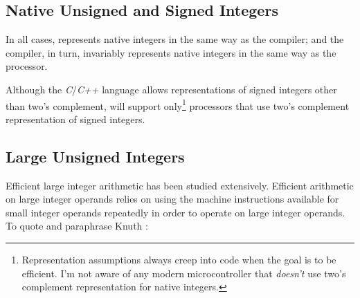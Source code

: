 \subsection{Native Unsigned and Signed Integers}
\label{cldd0:srnm0:srin0}

In all cases, \emph{\productbasenameshort{}} represents 
native integers in the same way as the compiler; and the 
compiler, in turn, invariably represents native integers in 
the same way as the processor.  

Although the \emph{C}/\emph{C++} language allows 
representations of signed integers other than two's 
complement, \emph{\productbasenameshort{}} will support 
only\footnote{Representation assumptions always creep into 
code when the goal is to be efficient.  I'm not aware of any 
modern microcontroller that \emph{doesn't} use two's 
complement representation for native integers.} processors 
that use two's complement representation of signed integers.  


\subsection{Large Unsigned Integers}
\label{cldd0:srnm0:srlu0}

Efficient large integer arithmetic has been studied 
extensively.  Efficient arithmetic on large integer operands 
relies on using the machine instructions available for small 
integer operands repeatedly in order to operate on large 
integer operands.  To quote and paraphrase Knuth \cite[pp.  
265-266]{bibref:b:TaocpVolume2}: 

